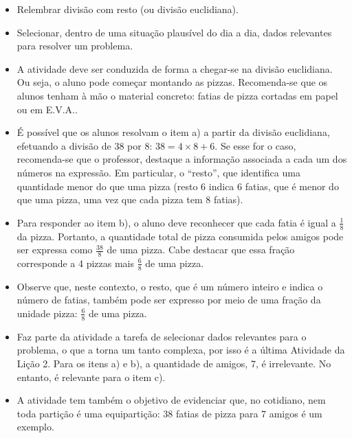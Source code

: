 \begin{multicols}{2}
\begin{objetivos}{}{}
\begin{itemize} %
    \item       Relembrar divisão com resto (ou divisão euclidiana).
    \item       Selecionar, dentro de uma situação plausível do dia a dia, dados relevantes para resolver um problema.
\end{itemize} %
\vspace{.1cm}
\end{objetivos}

\begin{orientacoes}
\begin{itemize} %
    \item       A atividade deve ser conduzida de forma a chegar-se na divisão euclidiana. Ou seja, o aluno pode começar montando as pizzas. Recomenda-se que os alunos tenham à mão o material concreto: fatias de pizza cortadas em papel ou em E.V.A..
    \item       É possível que os alunos resolvam o item a) a partir da divisão euclidiana, efetuando a divisão de 38 por 8: $38 = 4 \times 8 + 6$. Se esse for o caso, recomenda-se que o professor, destaque a informação associada a cada um dos números na expressão. Em particular, o       ``resto'', que identifica uma quantidade menor do que uma pizza (resto 6 indica 6 fatias, que é menor do que uma pizza, uma vez que cada pizza tem 8 fatias).
    \item       Para responder ao item b), o aluno deve reconhecer que cada fatia é igual a       $\frac{1}{8}$ da pizza. Portanto, a quantidade total de pizza consumida pelos amigos pode ser expressa como       $\frac{38}{8}$ de uma pizza. Cabe destacar que essa fração corresponde a 4 pizzas mais $\frac{6}{8}$ de uma pizza.
    \item        Observe que, neste contexto, o resto, que é um número inteiro e indica o número de fatias, também pode ser expresso por meio de uma fração da unidade pizza:       $\frac{6}{8}$ de uma pizza.
    \item       Faz parte da atividade a tarefa de selecionar dados relevantes para o problema, o que a torna um tanto complexa, por isso é a última Atividade da Lição 2. Para os itens a) e b), a quantidade de amigos, 7, é irrelevante. No entanto, é relevante para o item c).
    \item       A atividade tem também o objetivo de evidenciar que, no cotidiano, nem toda partição é uma equipartição: 38 fatias de pizza para 7 amigos é um exemplo.
\end{itemize} %
\end{orientacoes}


\end{multicols}
